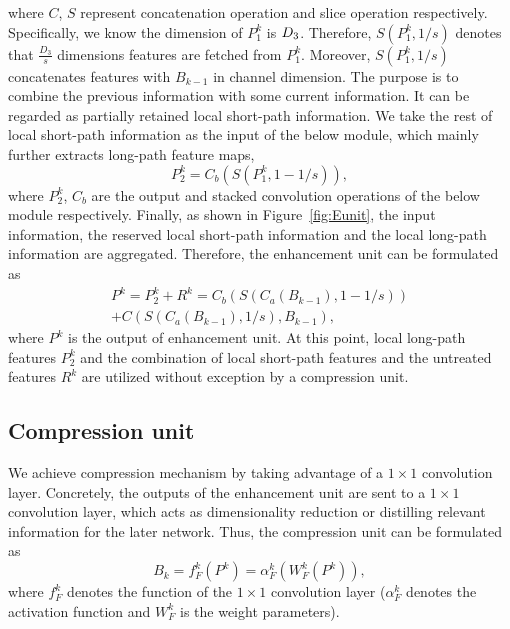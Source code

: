 \documentclass[10pt,twocolumn,letterpaper]{article}
\begin{document}
where $C$, $S$ represent concatenation operation and slice operation respectively. Specifically, we know the dimension of $P_1^k$ is ${D_{\rm{3}}}$. Therefore, $S\left( {P_1^k,1/s} \right)$ denotes that $\frac{{{D_3}}}{s}$ dimensions features are fetched from ${P_1^k}$. Moreover, $S\left( {P_1^k,1/s} \right)$ concatenates features with ${B_{k - 1}}$ in channel dimension. The purpose is to combine the previous information with some current information. It can be regarded as partially retained local short-path information. We take the rest of local short-path information as the input of the below module, which mainly further extracts long-path feature maps,
\begin{equation}
P_2^k = {C_b}\left( {S\left( {P_1^k,1 - 1/s} \right)} \right),
\end{equation}
where $P_2^k$, ${C_b}$ are the output and stacked convolution operations of the below module respectively. Finally, as shown in Figure~\ref{fig:Eunit}, the input information, the reserved local short-path information and the local long-path information are aggregated. Therefore, the enhancement unit can be formulated as
\begin{equation}
\begin{array}{l}
{P^k} = P_2^k + {R^k} = {C_b}\left( {S\left( {{C_a}\left( {{B_{k - 1}}} \right),1 - 1/s} \right)} \right)\\
+ C\left( {S\left( {{C_a}\left( {{B_{k - 1}}} \right),1/s} \right),{B_{k - 1}}} \right),
\end{array}
\end{equation}
where ${P^k}$ is the output of enhancement unit. At this point, local long-path features $P_2^k$ and the combination of local short-path features and the untreated features ${R^k}$ are utilized without exception by a compression unit.

\subsection{Compression unit}
We achieve compression mechanism by taking advantage of a $1\times1$ convolution layer. Concretely, the outputs of the enhancement unit are sent to a $1\times1$ convolution layer, which acts as dimensionality reduction or distilling relevant information for the later network. Thus, the compression unit can be formulated as
\begin{equation}
{B_k} = f_F^k\left( {{P^k}} \right) = \alpha _F^k\left( {W_F^k\left( {{P^k}} \right)} \right),
\end{equation}
where $f_F^k$ denotes the function of the $1\times1$ convolution layer ($\alpha _F^k$ denotes the activation function and $W_F^k$ is the weight parameters).
\end{document}

